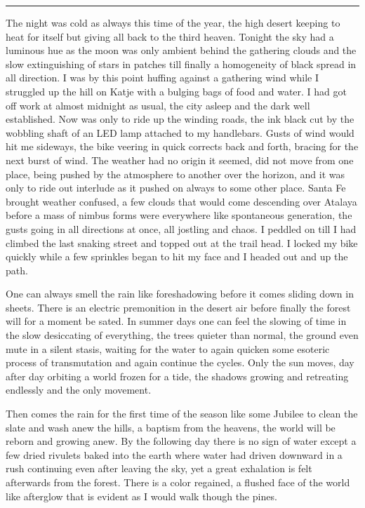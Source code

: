 \documentclass[ebook, 10pt, openright, onecolumn]{memoir}
\newcommand*\td[1]{
  \todo[inline]{
     #1 
  }
}
\newcommand*\starbreak{\fancybreak*{\Large{* * *}}}
\newcommand*\finish{\td{ ----- Finish this section -----}}
\begin{document}
\finish

\starbreak

The night was cold as always this time of the year, the high desert keeping to
heat for itself but giving all back to the third heaven.  Tonight the sky had a
luminous hue as the moon was only ambient behind the gathering clouds and the
slow extinguishing of stars in patches till finally a homogeneity of black
spread in all direction.  I was by this point huffing against a gathering wind
while I struggled up the hill on Katje with a bulging bags of food and water.  I
had got off work at almost midnight as usual, the city asleep and the dark well
established.  Now was only to ride up the winding roads, the ink black cut by
the wobbling shaft of an LED lamp attached to my handlebars.  Gusts of wind
would hit me sideways, the bike veering in quick corrects back and forth,
bracing for the next burst of wind.  The weather had no origin it seemed, did
not move from one place, being pushed by the atmosphere to another over the
horizon, and it was only to ride out interlude as it pushed on always to some
other place.  Santa Fe brought weather confused, a few clouds that would come
descending over Atalaya before a mass of nimbus forms were everywhere like
spontaneous generation, the gusts going in all directions at once, all jostling
and chaos.  I peddled on till I had climbed the last snaking street and topped
out at the trail head.  I locked my bike quickly while a few sprinkles began to
hit my face and I headed out and up the path.

One can always smell the rain like foreshadowing before it comes sliding down in
sheets.  There is an electric premonition in the desert air before finally the
forest will for a moment be sated.  In summer days one can feel the slowing of
time in the slow desiccating of everything, the trees quieter than normal, the
ground even mute in a silent stasis, waiting for the water to again quicken some
esoteric process of transmutation and again continue the cycles.  Only the sun
moves, day after day orbiting a world frozen for a tide, the shadows growing and
retreating endlessly and the only movement.

Then comes the rain for the first time of the season like some Jubilee to clean
the slate and wash anew the hills, a baptism from the heavens, the world will be
reborn and growing anew.  By the following day there is no sign of water except
a few dried rivulets baked into the earth where water had driven downward in a
rush continuing even after leaving the sky, yet a great exhalation is felt
afterwards from the forest.  There is a color regained, a flushed face of the
world like afterglow that is evident as I would walk though the pines.
\end{document}
